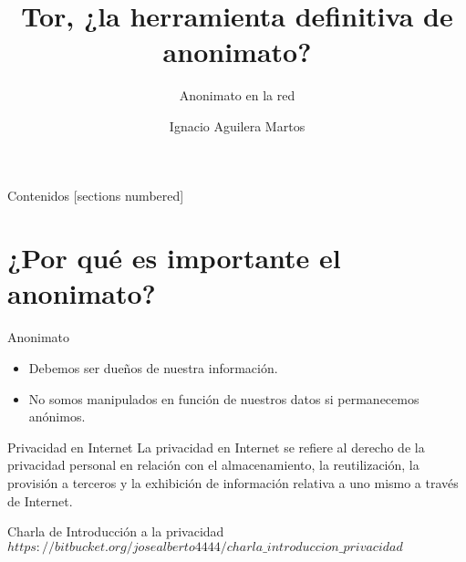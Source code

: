 \documentclass[10pt]{beamer}
\title{Tor, ¿la herramienta definitiva de anonimato?}
\subtitle{Anonimato en la red}
\date{}
\author{Ignacio Aguilera Martos}
\begin{document}
	

	
	
\frame{\titlepage}

	
\begin{frame}{Contenidos}
	[sections numbered]
	\tableofcontents[hideallsubsections]
\end{frame}

\section{¿Por qué es importante el anonimato?}

\begin{frame}{Anonimato}
	\begin{itemize}
		\item Debemos ser dueños de nuestra información. \pause
		\item No somos manipulados en función de nuestros datos si permanecemos anónimos. \pause
	\end{itemize}
	\begin{block}{Privacidad en Internet}
		\pause La privacidad en Internet se refiere al derecho de la privacidad personal en relación con el almacenamiento, la reutilización, la provisión a terceros y la exhibición de información relativa a uno mismo a través de Internet.
	\end{block}
	\pause
	\begin{alertblock}{Charla de Introducción a la privacidad}
		$https://bitbucket.org/josealberto4444/charla\_introduccion\_privacidad$
	\end{alertblock}
\end{frame}




	
\end{document}
